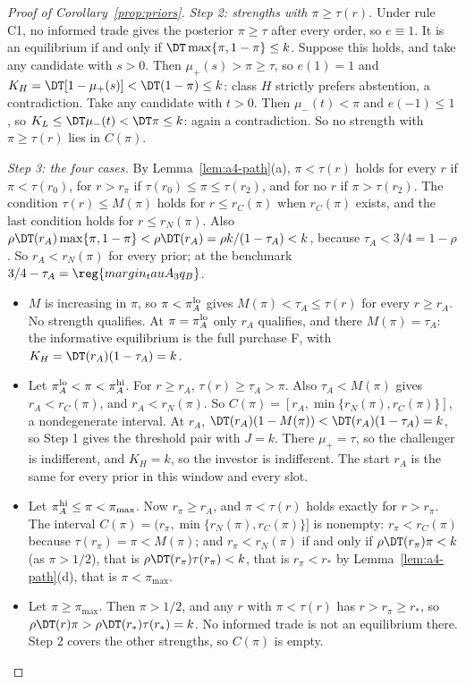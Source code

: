 \begin{proof}[Proof of Corollary~\ref{prop:priors}]
\emph{Step 2: strengths with \(\pi\ge\tau(r)\).} Under rule C1, no informed trade gives the posterior
\(\pi\ge\tau\) after every order, so \(e\equiv1\). It is an equilibrium if and only if
\(\DT\max\{\pi,1-\pi\}\le k\). Suppose this holds, and take any candidate with \(s>0\). Then
\(\mu_+(s)>\pi\ge\tau\), so \(e(1)=1\) and \(K_H=\DT[1-\mu_+(s)]<\DT(1-\pi)\le k\): class \(H\) strictly prefers
abstention, a contradiction. Take any candidate with \(t>0\). Then \(\mu_-(t)<\pi\) and \(e(-1)\le1\), so
\(K_L\le\DT\mu_-(t)<\DT\pi\le k\): again a contradiction. So no strength with \(\pi\ge\tau(r)\) lies in
\(C(\pi)\).

\emph{Step 3: the four cases.} By Lemma~\ref{lem:a4-path}(a), \(\pi<\tau(r)\) holds for every \(r\) if
\(\pi<\tau(r_0)\), for \(r>r_\pi\) if \(\tau(r_0)\le\pi\le\tau(r_2)\), and for no \(r\) if \(\pi>\tau(r_2)\). The
condition \(\tau(r)\le M(\pi)\) holds for \(r\le r_C(\pi)\) when \(r_C(\pi)\) exists, and the last condition holds
for \(r\le r_N(\pi)\). Also
\(\rho\DT(r_A)\max\{\pi,1-\pi\}<\rho\DT(r_A)=\rho k/(1-\tau_A)<k\), because \(\tau_A<3/4=1-\rho\). So
\(r_A<r_N(\pi)\) for every prior; at the benchmark \(3/4-\tau_A=\reg{margin_tauA_3q_B}\).
\begin{itemize}[leftmargin=2.5em]
\item[(a)] \(M\) is increasing in \(\pi\), so \(\pi<\pi_A^{\rm lo}\) gives \(M(\pi)<\tau_A\le\tau(r)\) for every
\(r\ge r_A\). No strength qualifies. At \(\pi=\pi_A^{\rm lo}\) only \(r_A\) qualifies, and there \(M(\pi)=\tau_A\):
the informative equilibrium is the full purchase F, with \(K_H=\DT(r_A)(1-\tau_A)=k\).
\item[(b)] Let \(\pi_A^{\rm lo}<\pi<\pi_A^{\rm hi}\). For \(r\ge r_A\), \(\tau(r)\ge\tau_A>\pi\). Also
\(\tau_A<M(\pi)\) gives \(r_A<r_C(\pi)\), and \(r_A<r_N(\pi)\). So \(C(\pi)=[r_A,\min\{r_N(\pi),r_C(\pi)\}]\), a
nondegenerate interval. At \(r_A\), \(\DT(r_A)(1-M(\pi))<\DT(r_A)(1-\tau_A)=k\), so Step 1 gives the threshold pair
with \(J=k\). There \(\mu_+=\tau\), so the challenger is indifferent, and \(K_H=k\), so the investor is
indifferent. The start \(r_A\) is the same for every prior in this window and every slot.
\item[(c)] Let \(\pi_A^{\rm hi}\le\pi<\pi_{\max}\). Now \(r_\pi\ge r_A\), and \(\pi<\tau(r)\) holds exactly for
\(r>r_\pi\). The interval \(C(\pi)=(r_\pi,\min\{r_N(\pi),r_C(\pi)\}]\) is nonempty: \(r_\pi<r_C(\pi)\) because
\(\tau(r_\pi)=\pi<M(\pi)\); and \(r_\pi<r_N(\pi)\) if and only if \(\rho\DT(r_\pi)\pi<k\) (as \(\pi>1/2\)), that is
\(\rho\DT(r_\pi)\tau(r_\pi)<k\), that is \(r_\pi<r_*\) by Lemma~\ref{lem:a4-path}(d), that is \(\pi<\pi_{\max}\).
\item[(d)] Let \(\pi\ge\pi_{\max}\). Then \(\pi>1/2\), and any \(r\) with \(\pi<\tau(r)\) has \(r>r_\pi\ge r_*\), so
\(\rho\DT(r)\pi>\rho\DT(r_*)\tau(r_*)=k\). No informed trade is not an equilibrium there. Step 2 covers the other
strengths, so \(C(\pi)\) is empty.
\end{itemize}


\end{proof}
